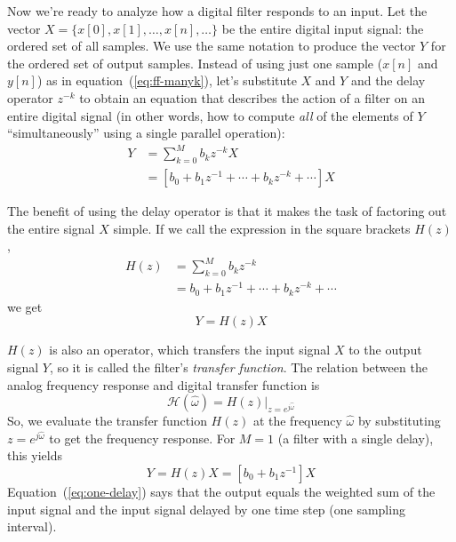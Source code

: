 \begin{sloppypar}
  Now we're ready to analyze how a digital filter responds to an
  input.  Let the vector $X=\{x[0], x[1], \ldots, x[n], \ldots\}$ be
  the entire digital input signal: the ordered set of all samples.  We
  use the same notation to produce the vector $Y$ for the ordered set
  of output samples. Instead of using just one sample ($x[n]$ and
  $y[n]$) as in equation~(\ref{eq:ff-manyk}), let's substitute $X$ and
  $Y$ and the delay operator $z^{-k}$ to obtain an equation that
  describes the action of a filter on an entire digital signal (in
  other words, how to compute \emph{all} of the elements of $Y$
  ``simultaneously'' using a single parallel operation):
\begin{align}
Y &=\sum_{k=0}^M b_k z^{-k} X\\
  &= [b_0 + b_1z^{-1} + \cdots + b_k z^{-k} + \cdots]X
\end{align}
\end{sloppypar}

The benefit of using the delay operator is that it makes the task of
factoring out the entire signal $X$ simple. If we call the expression
in the square brackets $H(z)$,
\begin{align}
H(z) &= \sum_{k=0}^M b_k z^{-k}\\
     &= b_0 + b_1z^{-1} + \cdots + b_k z^{-k} + \cdots
\end{align}
we get
\begin{equation}
Y = H(z)X
\end{equation}

$H(z)$ is also an operator, which transfers the input signal
$X$ to the output signal $Y$, so it is called the filter's
\emph{transfer function}. 
%
%
The relation between the analog frequency
response and digital transfer function is
\begin{equation}
\mathcal{H}(\hat{\omega}) = H(z)|_{z=e^{j\hat{\omega}}}
\end{equation}
So, we evaluate the transfer function $H(z)$ at the frequency
$\hat{\omega}$ by substituting $z=e^{j\hat\omega}$ to get the
frequency response.
For $M=1$ (a filter with a single delay), this yields
\begin{equation}
Y = H(z)X = [b_0 + b_1z^{-1}]X \label{eq:one-delay}
\end{equation}
Equation~(\ref{eq:one-delay}) says that the output equals the weighted
sum of the input signal and the input signal delayed by one time step
(one sampling interval).

